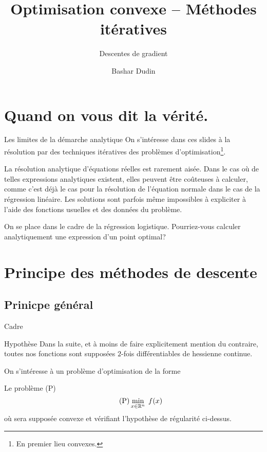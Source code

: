 \documentclass[aspectratio = 169]{beamer}
\author[BD]{Bashar Dudin}
\institute[]{EPITA}
\title{Optimisation convexe -- Méthodes itératives} %
\subtitle{Descentes de gradient}
\begin{document}
\begin{frame}[plain]
\titlepage %
\end{frame}

\section{Quand on vous dit la vérité.}

\begin{frame}{Les limites de la démarche analytique}
  On s'intéresse dans ces slides à la résolution par des techniques
  itératives des problèmes d'optimisation\footnote{En premier lieu
    convexes.}. \pause

  La résolution analytique d'équations réelles est rarement
  aisée. Dans le cas où de telles expressions analytiques existent,
  elles peuvent être coûteuses à calculer, comme c'est déjà le cas
  pour la résolution de l'équation normale dans le cas de la
  régression linéaire. \pause Les solutions sont parfois même
  impossibles à expliciter à l'aide des fonctions usuelles et des
  données du problème. \pause

  \begin{question}
    On se place dans le cadre de la régression
    logistique. Pourriez-vous calculer analytiquement une expression
    d'un point optimal?
  \end{question}
\end{frame}

\section{Principe des méthodes de descente}

\subsection{Prinicpe général}

\begin{frame}{Cadre}
  \begin{alertblock}{Hypothèse}
    Dans la suite, et à moins de faire explicitement mention du
    contraire, toutes nos fonctions sont supposées $2$-fois
    différentiables de hessienne continue.
  \end{alertblock}
  \pause On s'intéresse à un problème d'optimisation de la forme
  \begin{halfshyblock}{Le problème (P)}
    \begin{equation}
      \label{equation:P}
      \tag{P}
      \min_{x\in \mathbb{R}^n}\; f(x)
    \end{equation}
    où sera supposée convexe et vérifiant l'hypothèse de régularité
    ci-dessus.
  \end{halfshyblock}
\end{frame}
\end{document}
